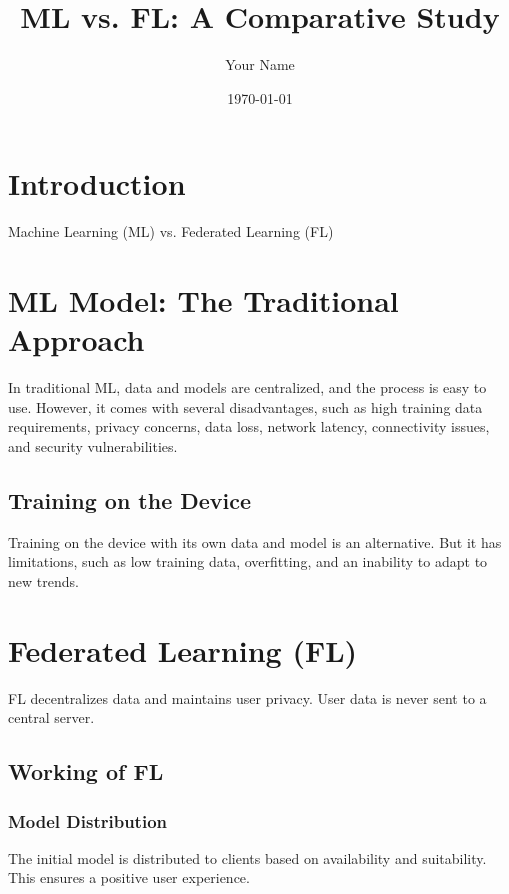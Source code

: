 \documentclass{article}
\begin{document}
\title{ML vs. FL: A Comparative Study}
\author{Your Name}
\date{\today}
\maketitle

\section{Introduction}

Machine Learning (ML) vs. Federated Learning (FL)

\section{ML Model: The Traditional Approach}

In traditional ML, data and models are centralized, and the process is easy to use. However, it comes with several disadvantages, such as high training data requirements, privacy concerns, data loss, network latency, connectivity issues, and security vulnerabilities.

\subsection{Training on the Device}

Training on the device with its own data and model is an alternative. But it has limitations, such as low training data, overfitting, and an inability to adapt to new trends.

\section{Federated Learning (FL)}

FL decentralizes data and maintains user privacy. User data is never sent to a central server.

\subsection{Working of FL}

\subsubsection{Model Distribution}

The initial model is distributed to clients based on availability and suitability. This ensures a positive user experience.
\end{document}
